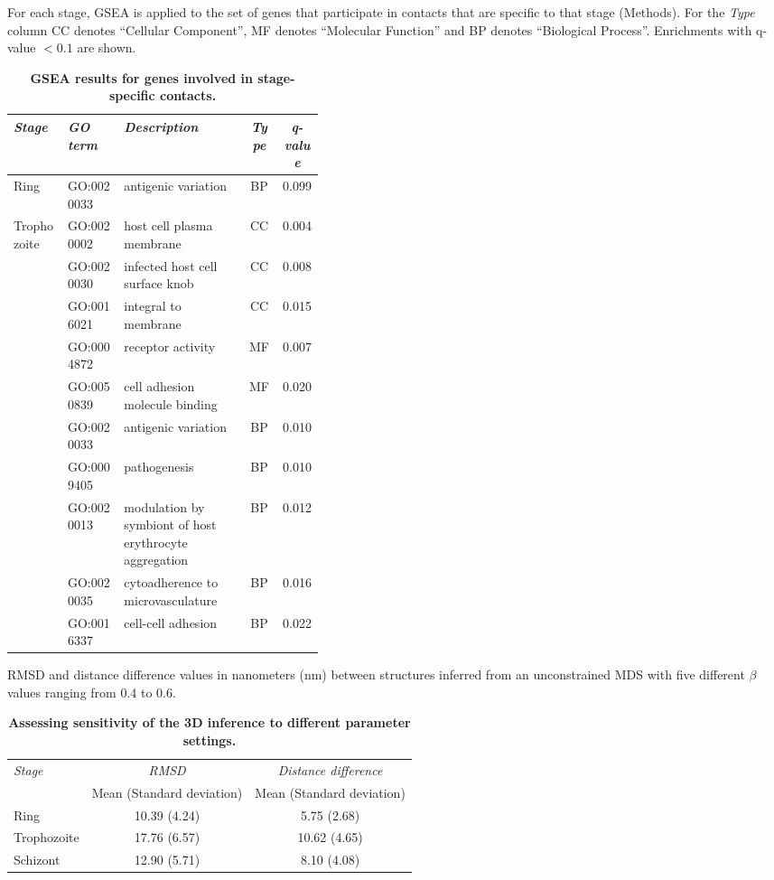 \begin{table}[ht!]
\caption{{\bf GSEA results for genes involved in stage-specific contacts.}}
{\normalsize For each stage, GSEA is applied to the set of genes that
participate in contacts that are specific to that stage (Methods). For the
\emph{Type} column CC denotes ``Cellular Component'', MF denotes ``Molecular
Function'' and BP denotes ``Biological Process''. Enrichments with q-value $<
0.1$ are shown. }
\vspace{10pt}
\begin{center}
\begin{tabular}{llp{0.4\linewidth}cc}
\hline
\emph{Stage} & \emph{GO term }&  \emph{Description} & \emph{Type} & \emph{q-value}  \\
\hline
\multirow{1}{*}{Ring}
& GO:0020033 & antigenic variation & BP & 0.099\\
\hline
\multirow{10}{*}{Trophozoite}
& GO:0020002 & host cell plasma membrane & CC & 0.004\\
& GO:0020030 & infected host cell surface knob & CC & 0.008\\
& GO:0016021 & integral to membrane & CC & 0.015\\
& GO:0004872 & receptor activity & MF & 0.007\\
& GO:0050839 & cell adhesion molecule binding & MF & 0.020\\
& GO:0020033 & antigenic variation & BP  & 0.010\\
& GO:0009405 & pathogenesis & BP & 0.010\\
& GO:0020013 & modulation by symbiont of host erythrocyte aggregation & BP & 0.012\\
& GO:0020035 & cytoadherence to microvasculature & BP & 0.016\\
& GO:0016337 & cell-cell adhesion & BP & 0.022\\
\hline
\end{tabular}
\end{center}
\label{table:GSEAcompareStages}
\end{table}
\clearpage


\begin{table}[ht!]
\caption{{\bf Assessing sensitivity of the 3D inference to different parameter settings.}}
{RMSD and distance difference values in nanometers (nm) between structures inferred from
an unconstrained MDS with five different $\beta$ values ranging from 0.4 to 0.6.}
\vspace{15pt}
\begin{center}
\begin{tabular}{lcc}
\hline
\multirow{2}{*}{\emph{Stage}} & \emph{RMSD} & \emph{Distance difference} \\
& Mean (Standard deviation) & Mean (Standard deviation) \\
\hline
Ring & 10.39 {(4.24)} & 5.75 {(2.68)} \\
Trophozoite & 17.76 {(6.57)} & 10.62 {(4.65)} \\
Schizont & 12.90 {(5.71)} & 8.10 {(4.08)} \\
\hline
\end{tabular}
\end{center}
\label{table:stabilityToBeta}
\end{table}
\clearpage


